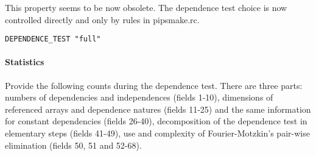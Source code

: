 This property seems to be now obsolete. The dependence test choice is
now controlled directly and only by rules in pipsmake.rc.

\begin{verbatim}
DEPENDENCE_TEST "full"
\end{verbatim}

\paragraph{Statistics}

Provide the following counts during the dependence test. There are three
parts: numbers of dependencies and independences (fields 1-10),
dimensions of referenced arrays and dependence natures (fields 11-25)
and the same information for constant dependencies (fields 26-40),
decomposition of the dependence test in elementary steps (fields 41-49),
use and complexity of Fourier-Motzkin's pair-wise elimination (fields
50, 51 and 52-68).

